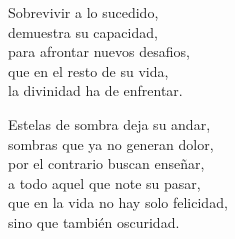 \begin{center}
\vspace{1em} 
Sobrevivir a lo sucedido,\\ 
demuestra su capacidad,\\ 
para afrontar nuevos desafios,\\ 
que en el resto de su vida,\\ 
la divinidad ha de enfrentar.

\vspace{1em} 
Estelas de sombra deja su andar,\\ 
sombras que ya no generan dolor,\\ 
por el contrario buscan enseñar,\\ 
a todo aquel que note su pasar,\\ 
que en la vida no hay solo felicidad,\\ 
sino que también oscuridad.


\end{center}




